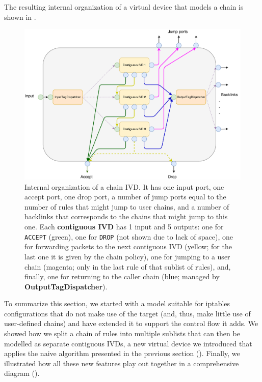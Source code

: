 The resulting internal organization of a virtual device that models a chain is
shown in .

\begin{figure}[h]
  \centering
  \includegraphics[scale=0.5]{assets/img/chain-internal}
  \caption[Internal organization of a chain IVD.]{Internal organization of a
  chain IVD.  It has one input port, one accept port, one drop port, a number
  of jump ports equal to the number of rules that might jump to user chains,
  and a number of backlinks that corresponds to the chains that might jump to
  this one.  Each \textbf{contiguous IVD} has 1 input and 5 outputs: one for
  \texttt{ACCEPT} (green), one for \texttt{DROP} (not shown due to lack of
  space), one for forwarding packets to the next contiguous IVD (yellow; for
  the last one it is given by the chain policy), one for jumping to a user
  chain (magenta; only in the last rule of that sublist of rules), and,
  finally, one for returning to the caller chain (blue; managed by
  \textbf{OutputTagDispatcher}).}
  \label{fig:chain-internal}
\end{figure}

\bigskip

To summarize this section, we started with a model suitable for iptables
configurations that do not make use of the \RETURN target (and, thus, make
little use of user-defined chains) and have extended it to support the control
flow it adds.  We showed how we split a chain of rules into multiple sublists
that can then be modelled as separate contiguous IVDs, a new virtual device we
introduced that applies the naive algorithm presented in the previous section
().  Finally, we illustrated how
all these new features play out together in a comprehensive diagram
().


